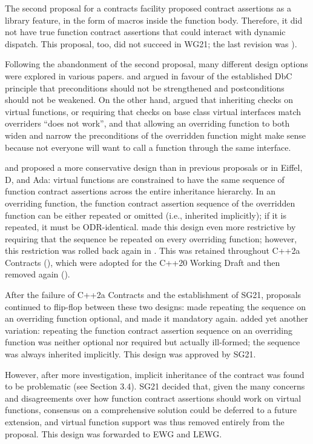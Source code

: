 The second proposal for a contracts facility \cite{N3604} proposed contract assertions as a library feature, in the form of macros inside the function body. Therefore, it did not have true function contract assertions that could interact with dynamic dispatch. This proposal, too, did not succeed in WG21; the last revision was \cite{N4378}).

Following the abandonment of the second proposal, many different design options were explored in various papers. \cite{N4110} and \cite{P0147R0} argued in favour of the established DbC principle that preconditions should not be strengthened and postconditions should not be weakened. On the other hand, \cite{P0247R0} argued that inheriting checks on virtual functions, or requiring that checks on base class virtual interfaces match overriders ``does not work'', and that allowing an overriding function to both widen and narrow the preconditions of the overridden function might make sense because not everyone will want to call a function through the same interface.

\cite{N4415} and \cite{P0287R0} proposed a more conservative design than in previous proposals or in Eiffel, D, and Ada: virtual functions are constrained to have the same sequence of function contract assertions across the entire inheritance hierarchy. In an overriding function, the function contract assertion sequence of the overridden function can be either repeated or omitted (i.e., inherited implicitly); if it is repeated, it must be ODR-identical. \cite{P0380R0} made this design even more restrictive by requiring that the sequence be repeated on every overriding function; however, this restriction was rolled back again in \cite{P0380R1}. This was retained throughout C++2a Contracts (\cite{P0542R5}), which were adopted for the C++20 Working Draft and then removed again (\cite{P1823R0}).

After the failure of C++2a Contracts and the establishment of SG21, proposals continued to flip-flop between these two designs: \cite{P2388R4} made repeating the sequence on an overriding function optional, and \cite{P2521R5} made it mandatory again. \cite{P2954R0} added yet another variation: repeating the function contract assertion sequence on an overriding function was neither optional nor required but actually ill-formed; the sequence was always inherited implicitly. This design was approved by SG21.

However, after more investigation, implicit inheritance of the contract was found to be problematic (see \cite{P2932R3} Section 3.4). SG21 decided that, given the many concerns and disagreements over how function contract assertions should work on virtual functions, consensus on a comprehensive
solution could be deferred to a future extension, and virtual function support was thus removed
entirely from the proposal. This design was forwarded to EWG and LEWG.

